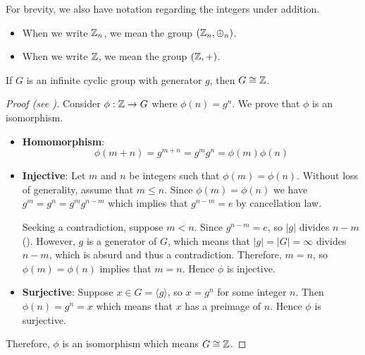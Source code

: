 For brevity, we also have notation regarding the integers under addition.
\begin{itemize}
    \item When we write $\mathbb{Z}_n$, we mean the group $(\mathbb{Z}_n, \oplus_n)$.
    \item When we write $\mathbb{Z}$, we mean the group $(\mathbb{Z}, +)$.
\end{itemize}

\begin{theorem}
    If $G$ is an infinite cyclic group with generator $g$, then $G \cong \mathbb{Z}$.
\end{theorem}
\begin{proof}[Proof (see \cite{proofwiki_infinite-cyclic-group})]
    Consider $\phi: \mathbb{Z} \to G$ where $\phi(n) = g^n$. We prove that $\phi$ is an isomorphism.
    \begin{itemize}
        \item \textbf{Homomorphism}:
        \[
            \phi(m+n) = g^{m+n} = g^mg^n = \phi(m)\phi(n)
        \]

        \item \textbf{Injective}: Let $m$ and $n$ be integers such that $\phi(m) = \phi(n)$. Without loss of generality, assume that $m \leq n$. Since $\phi(m) = \phi(n)$ we have $g^m = g^n = g^mg^{n-m}$ which implies that $g^{n-m} = e$ by cancellation law.

        Seeking a contradiction, suppose $m < n$. Since $g^{n-m} = e$, so $|g|$ divides $n-m$ (). However, $g$ is a generator of $G$, which means that $|g| = |G| = \infty$ divides $n-m$, which is absurd and thus a contradiction. Therefore, $m = n$, so $\phi(m) = \phi(n)$ implies that $m = n$. Hence $\phi$ is injective.

        \item \textbf{Surjective}: Suppose $x \in G = \langle g\rangle$, so $x = g^n$ for some integer $n$. Then $\phi(n) = g^n = x$ which means that $x$ has a preimage of $n$. Hence $\phi$ is surjective.
    \end{itemize}

    Therefore, $\phi$ is an isomorphism which means $G \cong \mathbb{Z}$.
\end{proof}

